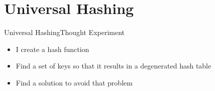 \section{Universal Hashing}


\begin{frame}{Universal Hashing}{Thought Experiment}
  \begin{itemize}
    \setlength\itemsep{1.5em}
    \item <1->
      I create a hash function
    \item <2->
      Find a set of keys so that it results in a degenerated hash table
    \item <3->
      Find a solution to avoid that problem
  \end{itemize}
\end{frame}


